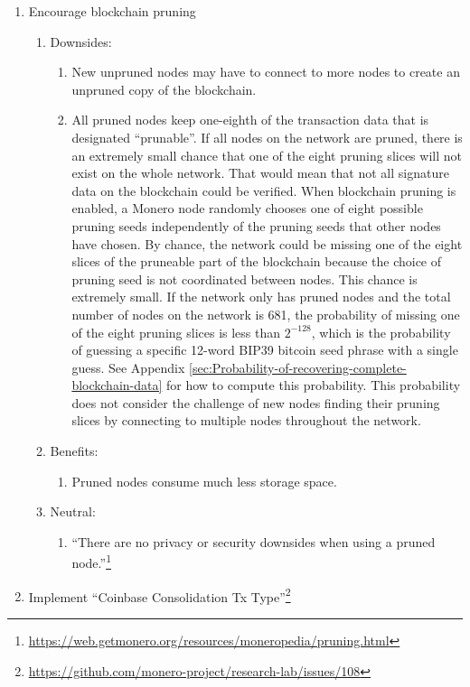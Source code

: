 \documentclass[english]{article}
\begin{document}
\begin{enumerate}
\begin{enumerate}
\begin{enumerate}
\end{enumerate}
\end{enumerate}
\item Encourage blockchain pruning
\begin{enumerate}
\item Downsides:
\begin{enumerate}
\item New unpruned nodes may have to connect to more nodes to create an
unpruned copy of the blockchain.
\item All pruned nodes keep one-eighth of the transaction data that is designated
``prunable''. If all nodes on the network are pruned, there is an
extremely small chance that one of the eight pruning slices will not
exist on the whole network. That would mean that not all signature
data on the blockchain could be verified. When blockchain pruning
is enabled, a Monero node randomly chooses one of eight possible pruning
seeds independently of the pruning seeds that other nodes have chosen.
By chance, the network could be missing one of the eight slices of
the pruneable part of the blockchain because the choice of pruning
seed is not coordinated between nodes. This chance is extremely small.
If the network only has pruned nodes and the total number of nodes
on the network is 681, the probability of missing one of the eight
pruning slices is less than $2^{-128}$, which is the probability
of guessing a specific 12-word BIP39 bitcoin seed phrase with a single
guess. See Appendix \ref{sec:Probability-of-recovering-complete-blockchain-data}
for how to compute this probability. This probability does not consider
the challenge of new nodes finding their pruning slices by connecting
to multiple nodes throughout the network.
\end{enumerate}
\item Benefits:
\begin{enumerate}
\item Pruned nodes consume much less storage space.
\end{enumerate}
\item Neutral:
\begin{enumerate}
\item ``There are no privacy or security downsides when using a pruned
node.''\footnote{\url{https://web.getmonero.org/resources/moneropedia/pruning.html}}
\end{enumerate}
\end{enumerate}
\item Implement ``Coinbase Consolidation Tx Type''\footnote{\url{https://github.com/monero-project/research-lab/issues/108}}

\end{enumerate}
\end{document}
